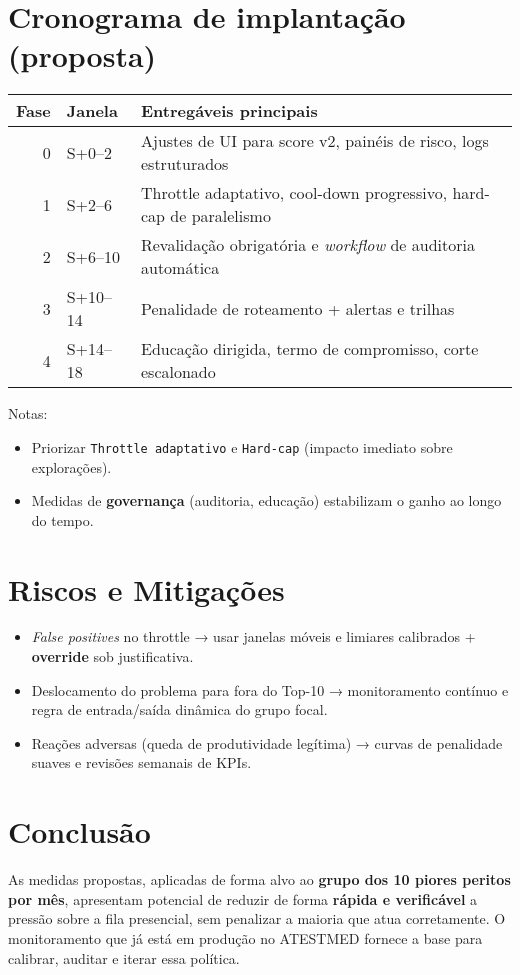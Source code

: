 \documentclass[11pt]{article}
\begin{document}
\section{Cronograma de implantação (proposta)}
\label{sec:org0dc7643}
\begin{center}
\begin{tabular}{rll}
Fase & Janela & Entregáveis principais\\
\hline
0 & S+0–2 & Ajustes de UI para score v2, painéis de risco, logs estruturados\\
1 & S+2–6 & Throttle adaptativo, cool-down progressivo, hard-cap de paralelismo\\
2 & S+6–10 & Revalidação obrigatória e \emph{workflow} de auditoria automática\\
3 & S+10–14 & Penalidade de roteamento + alertas e trilhas\\
4 & S+14–18 & Educação dirigida, termo de compromisso, corte escalonado\\
\end{tabular}
\end{center}

Notas:
\begin{itemize}
\item Priorizar \texttt{Throttle adaptativo} e \texttt{Hard-cap} (impacto imediato sobre explorações).
\item Medidas de \textbf{governança} (auditoria, educação) estabilizam o ganho ao longo do tempo.
\end{itemize}

\section{Riscos e Mitigações}
\label{sec:orgae4695e}
\begin{itemize}
\item \emph{False positives} no throttle → usar janelas móveis e limiares calibrados + \textbf{override} sob justificativa.
\item Deslocamento do problema para fora do Top-10 → monitoramento contínuo e regra de entrada/saída dinâmica do grupo focal.
\item Reações adversas (queda de produtividade legítima) → curvas de penalidade suaves e revisões semanais de KPIs.
\end{itemize}

\section{Conclusão}
\label{sec:org4b90cba}
As medidas propostas, aplicadas de forma alvo ao \textbf{grupo dos 10 piores peritos por mês}, apresentam potencial de reduzir de forma \textbf{rápida e verificável} a pressão sobre a fila presencial, sem penalizar a maioria que atua corretamente. O monitoramento que já está em produção no ATESTMED fornece a base para calibrar, auditar e iterar essa política.
\end{document}

